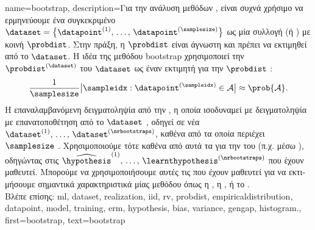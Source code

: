 {name={bootstrap},
	description={\foreignlanguage{greek}{Για την ανάλυση μεθόδων} 
		, \foreignlanguage{greek}{είναι συχνά χρήσιμο να ερμηνεύουμε ένα συγκεκριμένο}  
		 $\dataset = \big\{ \datapoint^{(1)}, \,\ldots, \,\datapoint^{(\samplesize)}\big\}$ \foreignlanguage{greek}{ως μία 
		συλλογή}   (\foreignlanguage{greek}{ή}   )
		\foreignlanguage{greek}{με κοινή}  $\probdist$. 
		\foreignlanguage{greek}{Στην πράξη, η}  $\probdist$ \foreignlanguage{greek}{είναι άγνωστη και 
		πρέπει να εκτιμηθεί από το $\dataset$. Η ιδέα της μεθόδου} bootstrap \foreignlanguage{greek}{χρησιμοποιεί 
		την}  $\probdist^{(\dataset)}$ \foreignlanguage{greek}{του $\dataset$ ως έναν εκτιμητή για την} 
		$\probdist$ \cite{hastie01statisticallearning}:
		$$ \frac{1}{\samplesize} \big| \sampleidx: \datapoint^{(\sampleidx)} \in \mathcal{A} \big| \approx \prob{\mathcal{A}}.$$
		\foreignlanguage{greek}{Η επαναλαμβανόμενη δειγματοληψία από την} , \foreignlanguage{greek}{η 
		οποία ισοδυναμεί με δειγματοληψία με επανατοποθέτηση από το} $\dataset$ \cite{BoostrapBook}, 
		\foreignlanguage{greek}{οδηγεί σε νέα}  $\dataset^{(1)}, \,\ldots, \,\dataset^{(\nrbootstraps)}$, 
		\foreignlanguage{greek}{καθένα από τα οποία περιέχει} $\samplesize$ . \foreignlanguage{greek}{Χρησιμοποιούμε 
		τότε καθένα από αυτά τα}  \foreignlanguage{greek}{για την}  \foreignlanguage{greek}{του} 
		 \foreignlanguage{greek}{(π.χ. μέσω} ), \foreignlanguage{greek}{οδηγώντας στις}
		 $\widehat{\hypothesis}^{(1)}, \,\ldots, \,\learnthypothesis^{(\nrbootstraps)}$ \foreignlanguage{greek}{που έχουν 
		μαθευτεί. Μπορούμε να χρησιμοποιήσουμε αυτές τις}  \foreignlanguage{greek}{που έχουν μαθευτεί για 
		να εκτιμήσουμε σημαντικά χαρακτηριστικά μίας μεθόδου}  \foreignlanguage{greek}{όπως η} , 
		\foreignlanguage{greek}{η} , \foreignlanguage{greek}{ή το}  \cite{hastie01statisticallearning}.
		\\
		\foreignlanguage{greek}{Βλέπε επίσης:} \gls{ml}, \gls{dataset}, \gls{realization}, \gls{iid}, \gls{rv}, \gls{probdist}, \gls{empiricaldistribution},
		\gls{datapoint}, \gls{model}, \gls{training}, \gls{erm}, \gls{hypothesis}, \gls{bias}, \gls{variance}, \gls{gengap}, \gls{histogram}.},
	first={bootstrap},
	text={bootstrap}
}%

